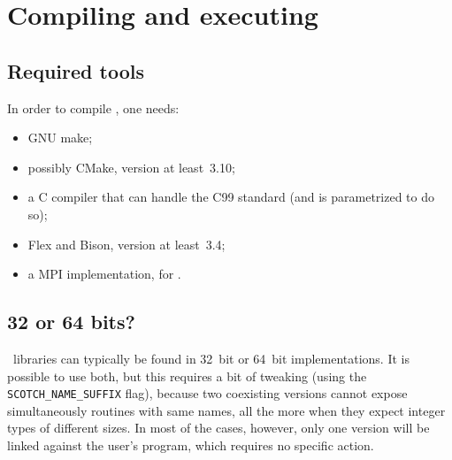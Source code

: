 
\section{Compiling and executing \scotch}

\subsection{Required tools}

In order to compile \scotch, one needs:
\begin{itemize}
\item
  GNU make;
\item
  possibly CMake, version at least~3.10;
\item
  a C compiler that can handle the C99 standard (and is parametrized
  to do so);
\item
  Flex and Bison, version at least~3.4;
\item
  a MPI implementation, for \ptscotch.
\end{itemize}

\subsection{32 or 64 bits?}
\label{sec-c-integer}

\scotch\ libraries can typically be found in 32~bit or 64~bit
implementations. It is possible to use both, but this requires a bit
of tweaking (using the \texttt{SCOTCH\_\lbt NAME\_\lbt SUFFIX} flag),
because two coexisting versions cannot expose simultaneously routines
with same names, all the more when they expect integer types of
different sizes. In most of the cases, however, only one version will
be linked against the user's program, which requires no specific
action.

